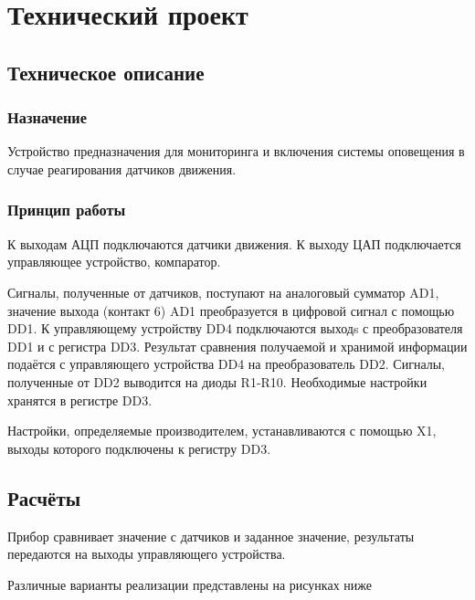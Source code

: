 \chapter{Технический проект}
	\section{Техническое описание}
		\subsection{Назначение}
				Устройство предназначения для мониторинга и включения системы оповещения в случае
			реагирования датчиков движения.
		\subsection{Принцип работы}
				К выходам АЦП подключаются датчики движения. К выходу ЦАП подключается
			управляющее устройство, компаратор.

				Сигналы, полученные от датчиков, поступают на аналоговый сумматор AD1, значение
			выхода (контакт 6) AD1 преобразуется в цифровой сигнал с помощью DD1. К
			управляющему устройству DD4 подключаются выходs с преобразователя DD1 и с регистра
			DD3. Результат сравнения получаемой и хранимой информации подаётся с управляющего
			устройства DD4 на преобразователь DD2. Сигналы, полученные от DD2 выводится на диоды
			R1-R10. Необходимые настройки хранятся в регистре DD3.

				Настройки, определяемые производителем, устанавливаются с помощью X1, выходы
			которого подключены к регистру DD3.
	\section{Расчёты}
			Прибор сравнивает значение с датчиков и заданное значение, результаты передаются на
		выходы управляющего устройства.

			Различные варианты реализации представлены на рисунках ниже
